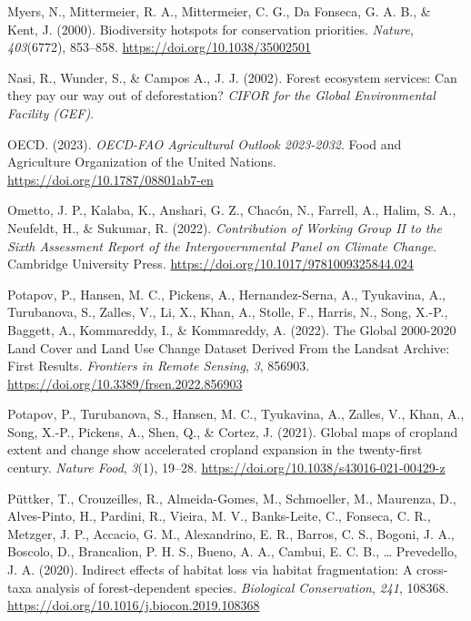 \documentclass[
  letterpaper,
  DIV=11,
  numbers=noendperiod]{scrreprt}
\newlength{\cslhangindent}
\newlength{\cslentryspacingunit} %
\newenvironment{CSLReferences}[2] %
 {%
  \setlength{\parindent}{0pt}
  \ifodd #1
  \let\oldpar\par
  \def\par{\hangindent=\cslhangindent\oldpar}
  \fi
  \setlength{\parskip}{#2\cslentryspacingunit}
 }%
 {}
\begin{document}
\begin{CSLReferences}{1}{0}
\leavevmode{}%
Myers, N., Mittermeier, R. A., Mittermeier, C. G., Da Fonseca, G. A. B.,
\& Kent, J. (2000). Biodiversity hotspots for conservation priorities.
\emph{Nature}, \emph{403}(6772), 853--858.
\url{https://doi.org/10.1038/35002501}

\leavevmode{}%
Nasi, R., Wunder, S., \& Campos A., J. J. (2002). Forest ecosystem
services: Can they pay our way out of deforestation? \emph{CIFOR for the
Global Environmental Facility (GEF)}.

\leavevmode{}%
OECD. (2023). \emph{{OECD-FAO Agricultural Outlook} 2023-2032}. {Food
and Agriculture Organization of the United Nations}.
\url{https://doi.org/10.1787/08801ab7-en}

\leavevmode{}%
Ometto, J. P., Kalaba, K., Anshari, G. Z., Chacón, N., Farrell, A.,
Halim, S. A., Neufeldt, H., \& Sukumar, R. (2022). \emph{Contribution of
{Working Group II} to the {Sixth Assessment Report} of the
{Intergovernmental Panel} on {Climate Change}}. {Cambridge University
Press}. \url{https://doi.org/10.1017/9781009325844.024}

\leavevmode{}%
Potapov, P., Hansen, M. C., Pickens, A., Hernandez-Serna, A., Tyukavina,
A., Turubanova, S., Zalles, V., Li, X., Khan, A., Stolle, F., Harris,
N., Song, X.-P., Baggett, A., Kommareddy, I., \& Kommareddy, A. (2022).
The {Global} 2000-2020 {Land Cover} and {Land Use Change Dataset Derived
From} the {Landsat Archive}: {First Results}. \emph{Frontiers in Remote
Sensing}, \emph{3}, 856903.
\url{https://doi.org/10.3389/frsen.2022.856903}

\leavevmode{}%
Potapov, P., Turubanova, S., Hansen, M. C., Tyukavina, A., Zalles, V.,
Khan, A., Song, X.-P., Pickens, A., Shen, Q., \& Cortez, J. (2021).
Global maps of cropland extent and change show accelerated cropland
expansion in the twenty-first century. \emph{Nature Food}, \emph{3}(1),
19--28. \url{https://doi.org/10.1038/s43016-021-00429-z}

\leavevmode{}%
Püttker, T., Crouzeilles, R., Almeida-Gomes, M., Schmoeller, M.,
Maurenza, D., Alves-Pinto, H., Pardini, R., Vieira, M. V., Banks-Leite,
C., Fonseca, C. R., Metzger, J. P., Accacio, G. M., Alexandrino, E. R.,
Barros, C. S., Bogoni, J. A., Boscolo, D., Brancalion, P. H. S., Bueno,
A. A., Cambui, E. C. B., \ldots{} Prevedello, J. A. (2020). Indirect
effects of habitat loss via habitat fragmentation: {A} cross-taxa
analysis of forest-dependent species. \emph{Biological Conservation},
\emph{241}, 108368. \url{https://doi.org/10.1016/j.biocon.2019.108368}


\end{CSLReferences}
\end{document}
